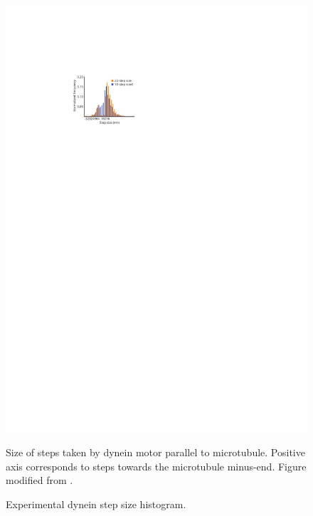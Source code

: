 \documentclass[10pt]{article} %
\begin{document}
\begin{figure}[h!]
  \centering
  \begin{minipage}[b]{0.45\textwidth}
    \includegraphics[width=\textwidth]{../../figures/weihong-step-size}
    \caption{Experimental dynein step size histogram.}{Size of steps taken by dynein motor parallel to microtubule. Positive axis corresponds to steps towards the microtubule minus-end. Figure modified from \cite{weihongpaper}.}
  \end{minipage}
  \hspace{.2cm}
  \begin{minipage}[b]{0.45\textwidth}

\end{minipage}
\end{figure}
\end{document}
